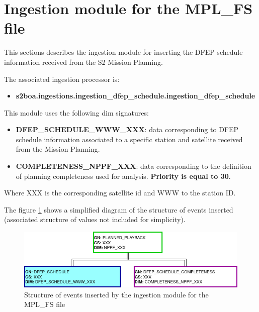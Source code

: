 \section{Ingestion module for the MPL\_FS file}

This sections describes the ingestion module for inserting the DFEP schedule information received from the S2 Mission Planning.

The associated ingestion processor is:

\begin{itemize} 

\item \textbf{s2boa.ingestions.ingestion\_dfep\_schedule.ingestion\_dfep\_schedule}
  
\end{itemize}

This module uses the following \acrshort{dim} signatures:

\begin{itemize} 

\item \textbf{DFEP\_SCHEDULE\_WWW\_XXX}: data corresponding to DFEP schedule information associated to a specific station and satellite received from the Mission Planning.

\item \textbf{COMPLETENESS\_NPPF\_XXX}: data corresponding to the definition of planning completeness used for analysis. \textbf{Priority is equal to 30}.
  
\end{itemize}

Where XXX is the corresponding satellite id and WWW to the station ID.

The figure \ref{fg:structure_ingestion_dfep_schedule} shows a simplified diagram of the structure of events inserted (associated structure of values not included for simplicity).

\begin{figure}[H]
  \begin{center}
	\centering\includegraphics[width=150mm]{../fig/structure_ingestion_dfep_schedule.png}
	\caption{Structure of events inserted by the ingestion module for the MPL\_FS file}
	\label{fg:structure_ingestion_dfep_schedule}
  \end{center}
\end{figure}

